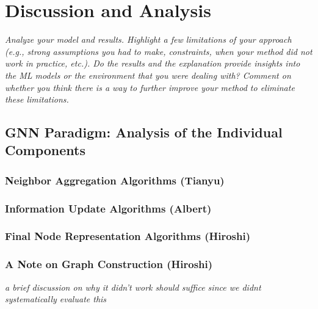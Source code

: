 \documentclass{article}
\begin{document}


\section{Discussion and Analysis}

\textit{Analyze your model and results. Highlight a few limitations of your approach (e.g., strong assumptions you had to make, constraints, when your method did not work in practice, etc.). Do
the results and the explanation provide insights into the ML models or the environment that you were dealing with? Comment on whether you think there is a way to further improve your method to eliminate these limitations.}

\subsection{GNN Paradigm: Analysis of the Individual Components}

\subsubsection{Neighbor Aggregation Algorithms (Tianyu)}

\subsubsection{Information Update Algorithms (Albert)}



\subsubsection{Final Node Representation Algorithms (Hiroshi)}

\subsubsection{A Note on Graph Construction (Hiroshi)}

\textit{a brief discussion on why it didn't work should suffice since we didnt systematically evaluate this}
\end{document}
